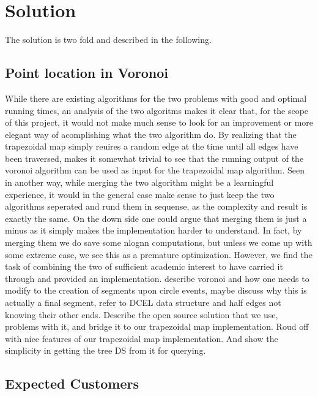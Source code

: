 \section{Solution}

The solution is two fold and described in the following.

\subsection{Point location in Voronoi}
While there are existing algorithms for the two problems with good and optimal running times, an analysis of the two algoritms makes
it clear that, for the scope of this project, it would not make much sense to look for an improvement or more elegant way of acomplishing what
the two algorithm do. By realizing that the trapezoidal map simply reuires a random edge at the time until all edges have been traversed, makes it somewhat trivial to see that the running output of the voronoi algorithm can be used as input for the trapezoidal map algorithm. Seen in another way, while merging the two algorithm might be a learningful experience, it would in the general case make sense to just keep the two algorithms seperated and rund them in sequense, as the complexity and result is exactly the same. On the down side one could argue that merging them is just a minus as it simply makes the implementation harder to understand. In fact, by merging them we do save some nlognn computations, but unless we come up with some extreme case, we see this as a premature optimization. However, we find the task of combining the two of sufficient academic interest to have carried it through and provided an implementation. describe voronoi and how one needs to modify to the creation of segments upon circle events, maybe discuss why this is actually a final segment, refer to DCEL data structure and half edges not knowing their other ends. Describe the open source solution that we use, problems with it, and bridge it to our trapezoidal map implementation. Roud off with nice features of our trapezoidal map implementation. And show the simplicity in getting the tree DS from it for querying.


\subsection{Expected Customers}

